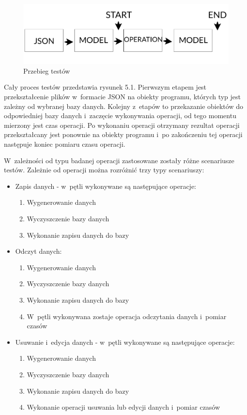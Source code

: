 \begin{figure}[h]
\centering
	\includegraphics[width=\linewidth]{img/database/operation-scheme.png}
	\caption{Przebieg testów}
	\label{fig: operation_scheme}
\end{figure}

Cały proces testów przedstawia rysunek 5.1.  Pierwszym etapem jest przekształcenie plików w~formacie JSON na obiekty programu, których typ jest zależny od wybranej bazy danych. Kolejny z~etapów to przekazanie obiektów do odpowiedniej bazy danych i~zaczęcie wykonywania operacji, od tego momentu mierzony jest czas operacji. Po wykonaniu operacji otrzymany rezultat operacji przekształcany jest ponownie na obiekty programu i~po zakończeniu tej operacji następuje koniec pomiaru czasu operacji. 

 W~zależności od typu badanej operacji zastosowane zostały różne scenariusze testów. Zależnie od operacji można rozróżnić trzy typy scenariuszy: 

\begin{itemize}
	 \item Zapis danych - w~pętli wykonywane są następujące operacje:
	 
	 \begin{enumerate}
	 \item Wygenerowanie danych
	 \item Wyczyszczenie bazy danych
	 \item Wykonanie zapisu danych do bazy
	 \end{enumerate}
	 
	 \item Odczyt danych:
	 
	  \begin{enumerate}
	 \item Wygenerowanie danych
	 \item Wyczyszczenie bazy danych
	 \item Wykonanie zapisu danych do bazy
	 \item W~pętli wykonywana zostaje operacja odczytania danych i~pomiar czasów
	 \end{enumerate}
	 
	 \item Usuwanie i~edycja danych - w~pętli wykonywane są następujące operacje:
	 
	 \begin{enumerate}
	 \item Wygenerowanie danych
	 \item Wyczyszczenie bazy danych
	 \item Wykonanie zapisu danych do bazy
	 \item Wykonanie operacji usuwania lub edycji danych i~pomiar czasów
	 \end{enumerate}
	 
\end{itemize}

